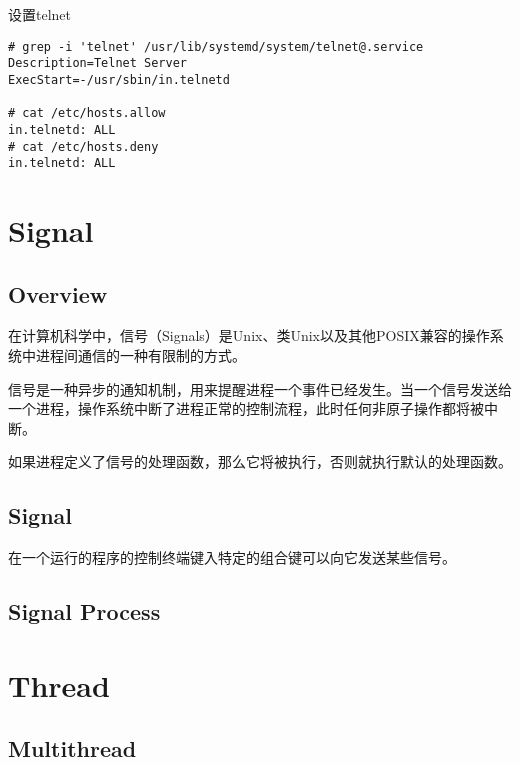 \begin{compactitem}
\item 设置telnet

\begin{verbatim}
# grep -i 'telnet' /usr/lib/systemd/system/telnet@.service 
Description=Telnet Server
ExecStart=-/usr/sbin/in.telnetd

# cat /etc/hosts.allow
in.telnetd: ALL
# cat /etc/hosts.deny
in.telnetd: ALL
\end{verbatim}

\end{compactitem}



\chapter{Signal}



\section{Overview}

在计算机科学中，信号（Signals）是Unix、类Unix以及其他POSIX兼容的操作系统中进程间通信的一种有限制的方式。

信号是一种异步的通知机制，用来提醒进程一个事件已经发生。当一个信号发送给一个进程，操作系统中断了进程正常的控制流程，此时任何非原子操作都将被中断。

如果进程定义了信号的处理函数，那么它将被执行，否则就执行默认的处理函数。



\section{Signal }

在一个运行的程序的控制终端键入特定的组合键可以向它发送某些信号。





\section{Signal Process}




















\chapter{Thread}




\section{Multithread}

